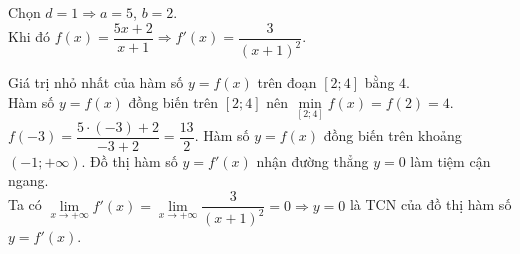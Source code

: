 \begin{ex}
{		Chọn $d=1 \Rightarrow a=5$, $b=2$. \\
		Khi đó $f(x)=\dfrac{5x+2}{x+1} \Rightarrow f'(x)=\dfrac{3}{\left(x+1\right)^2}$.
		\begin{itemchoice}
			\itemch Giá trị nhỏ nhất của hàm số $y=f(x)$ trên đoạn $\left[2;4\right]$ bằng $4$. \\
			Hàm số $y=f(x)$ đồng biến trên $\left[2;4\right]$ nên ${\min \limits_{\left[2;4\right]}} f(x)=f(2)=4$.
			\itemch $f(-3) = \dfrac{5 \cdot (-3) + 2}{-3+2}=\dfrac{13}{2}$.
			\itemch Hàm số $y=f(x)$ đồng biến trên khoảng $\left(-1;+\infty \right)$.
			\itemch Đồ thị hàm số $y=f'(x)$ nhận đường thẳng $y=0$ làm tiệm cận ngang. \\
			Ta có $\lim \limits_{x\to+\infty} f'(x) = \lim \limits_{x\to+\infty} \dfrac{3}{(x+1)^2}=0\Rightarrow y=0$ là TCN của đồ thị hàm số $y=f'(x)$.
		\end{itemchoice}
	}
\end{ex}
 

